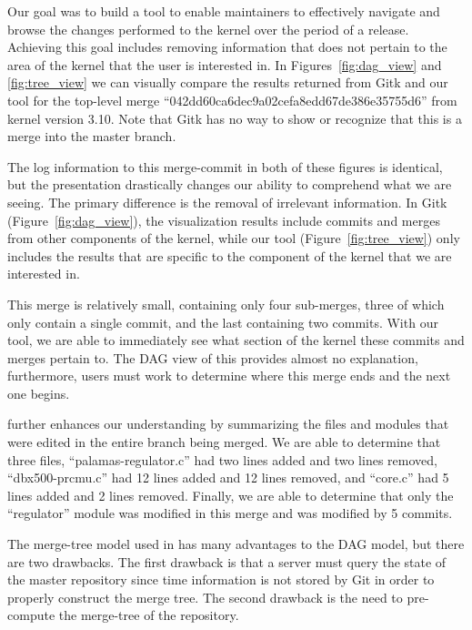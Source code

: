 \documentclass[conference, draftclsnofoot, draft]{IEEEtran}
\begin{document}
Our goal was to build a tool to enable maintainers to effectively navigate and
browse the changes performed to the kernel over the period of a release. Achieving
this goal includes removing information that does not pertain to the area of the
kernel that the user is interested in. In Figures~\ref{fig:dag_view} and
\ref{fig:tree_view} we can visually compare the results returned from Gitk
and our tool for the top-level merge ``042dd60ca6dec9a02cefa8edd67de386e35755d6''
from kernel version 3.10. Note that Gitk has no way to show or recognize that this
is a merge into the master branch.

The log information to this merge-commit in both of these figures is identical, but
the presentation drastically changes our ability to comprehend what we are seeing.
The primary difference is the removal of irrelevant information. In Gitk
(Figure~\ref{fig:dag_view}), the visualization results include commits and merges
from other components of the kernel, while our tool (Figure~\ref{fig:tree_view})
only includes the results that are specific to the component of the kernel that we
are interested in.

This merge is relatively small, containing only four sub-merges, three of which
only contain a single commit, and the last containing two commits. With our
tool, we are able to immediately see what section of the kernel these commits and merges pertain to. The DAG view of this provides almost no explanation,
furthermore, users must work to determine where this merge ends and the next one
begins.

\tool further enhances our understanding by summarizing the files
and modules that were edited in the entire branch being merged. We are able to determine that three
files, ``palamas-regulator.c'' had two lines added and two lines removed,
``dbx500-prcmu.c'' had 12 lines added and 12 lines removed, and ``core.c'' had 5
lines added and 2 lines removed. Finally, we are able to determine that only the
``regulator'' module was modified in this merge and was modified by 5 commits.


The merge-tree model used in \tool has many advantages to the DAG model, but there
are two drawbacks. The first drawback is that a server must query the state of the
master repository since time information is not stored by Git in order to properly
construct the merge tree. The second drawback is the need to pre-compute the
merge-tree of the repository.

\end{document}

